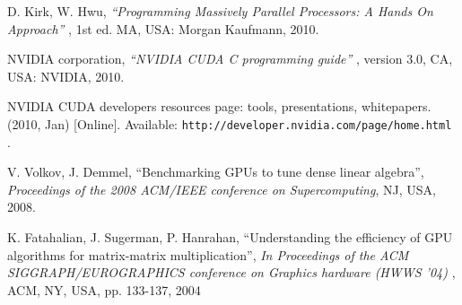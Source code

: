 \documentclass{acm_proc_article-sp}
\begin{document}
\begin{thebibliography}{9999}
 D. Kirk, W. Hwu, {\it ``Programming Massively Parallel Processors: A Hands On Approach'' }, 1st ed. MA, USA: Morgan Kaufmann, 2010.

 NVIDIA corporation, {\it ``NVIDIA CUDA C programming guide'' }, version 3.0, CA, USA: NVIDIA, 2010.

 NVIDIA CUDA developers resources page: tools, presentations, whitepapers. (2010, Jan) [Online]. Available: {\tt http://developer.nvidia.com/page/home.html }.




 V. Volkov, J. Demmel, ``Benchmarking GPUs to tune dense linear algebra'', {\it Proceedings of the 2008 ACM/IEEE conference on Supercomputing}, NJ, USA, 2008.

 K. Fatahalian, J. Sugerman, P. Hanrahan, ``Understanding the efficiency of GPU algorithms for matrix-matrix multiplication'', {\it In Proceedings of the ACM SIGGRAPH/EUROGRAPHICS conference on Graphics hardware (HWWS '04) }, ACM, NY, USA, pp. 133-137, 2004

\end{thebibliography}


%
%


\end{document}
